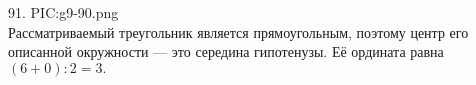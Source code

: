 91. {{PIC:g9-90.png}}\\
Рассматриваемый треугольник является прямоугольным, поэтому центр его описанной окружности --- это середина гипотенузы. Её ордината равна $(6+0):2=3.$\newpage\noindent
